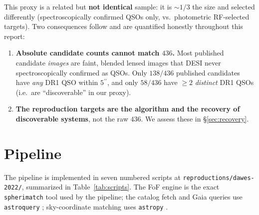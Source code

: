 \documentclass[11pt,letterpaper]{article}
\newcommand{\asec}{\ensuremath{^{\prime\prime}}}
\begin{document}
This proxy is a related but \textbf{not identical} sample: it is
${\sim}1/3$ the size and selected differently (spectroscopically confirmed
QSOs only, vs.\ photometric RF-selected targets). Two consequences follow
and are quantified honestly throughout this report:
\begin{enumerate}
\item \textbf{Absolute candidate counts cannot match $436$.} Most published
      candidate \emph{images} are faint, blended lensed images that DESI
      never spectroscopically confirmed as QSOs. Only $138/436$ published
      candidates have \emph{any} DR1 QSO within $5\asec$, and only
      $58/436$ have $\geq 2$ \emph{distinct} DR1 QSOs (i.e.\ are
      ``discoverable'' in our proxy).
\item \textbf{The reproduction targets are the algorithm and the recovery
      of discoverable systems}, not the raw $436$. We assess these in
      \S\ref{sec:recovery}.
\end{enumerate}

\section{Pipeline}

The pipeline is implemented in seven numbered scripts at
\texttt{reproductions/dawes-2022/}, summarized in Table~\ref{tab:scripts}.
The FoF engine is the exact \texttt{spherimatch} \autocite{spherimatch}
tool used by the \citet{hsu2025pairwise} pipeline; the catalog fetch and
Gaia queries use \texttt{astroquery} \autocite{astroquery2019}; sky-coordinate
matching uses \texttt{astropy} \autocite{astropy2022}.
\end{document}
